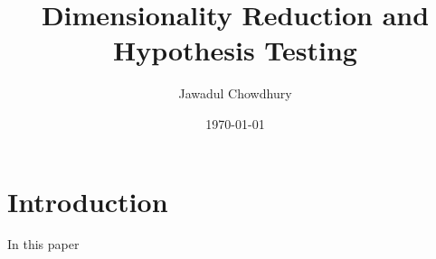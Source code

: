 \documentclass[a4paper, twocolumn]{article}
\title{Dimensionality Reduction and Hypothesis Testing}
\author{Jawadul Chowdhury}
\date{\today}
\begin{document}
\setlength{\intextsep}{0pt} 
\setlength{\textfloatsep}{5pt} 

\maketitle
\onecolumn
\tableofcontents
\newpage
\twocolumn


\section{Introduction}
In this paper
\end{document}
